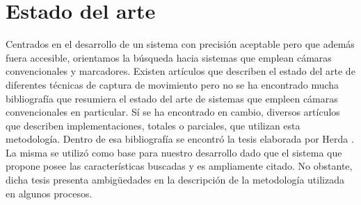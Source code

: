 \section{Estado del arte}\label{estadoDelArte}
Centrados en el desarrollo de un sistema con precisión aceptable pero que además fuera accesible, orientamos la búsqueda hacia sistemas que emplean cámaras convencionales y marcadores. Existen artículos que describen el estado del arte de diferentes técnicas de captura de movimiento pero no se ha encontrado mucha bibliografía que resumiera el estado del arte de sistemas que empleen cámaras convencionales en particular. Sí se ha encontrado en cambio, diversos artículos que describen implementaciones, totales o parciales, que utilizan esta metodología. Dentro de esa bibliografía se encontró la tesis elaborada por Herda  \cite{herda}. La misma se utilizó como base para nuestro desarrollo dado que el sistema que propone posee las características buscadas y es ampliamente citado. No obstante, dicha tesis presenta ambigüedades en la descripción de la metodología utilizada en algunos procesos.\\
